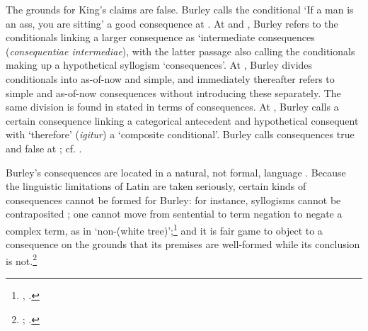\documentclass[]{article}
\begin{document}
{	The grounds for King's claims are false. Burley calls the conditional `If a man is an ass, you are sitting' a good consequence at \cite[II. i. 1, p. 61]{BurleyDPAL}. At \cite[p. 114, par. 8]{Green-Pedersen1980b} and \cite[p. 89.1-31]{BurleyDPAL}, Burley refers to the conditionals linking a larger consequence as `intermediate consequences (\textit{consequentiae intermediae}), with the latter passage also calling the conditionals making up a hypothetical syllogism `consequences'. At \cite[p. 128, par. 68]{Green-Pedersen1980b}, Burley divides conditionals into as-of-now and simple, and immediately thereafter refers to simple and as-of-now consequences without introducing these separately. The same division is found in \cite[pp. 60.28-61.5]{BurleyDPAL} stated in terms of consequences. At \cite[p. 78.27-30]{BurleyDPAL}, Burley calls a certain consequence linking a categorical antecedent and hypothetical consequent with `therefore' (\textit{igitur}) a `composite conditional'. Burley calls consequences true and false at \cite[p. 113, par. 2-3]{Green-Pedersen1980b}; cf. \cite[p. 15, par. 19]{Green-Pedersen1980a}.} 

Burley's consequences are located in a natural, not formal, language \cite[pp. 4-5]{HodgesBurley}. Because the linguistic limitations of Latin are taken seriously, certain kinds of consequences cannot be formed for Burley: for instance, syllogisms cannot be contraposited \cite[pp. 65.3-17; 207.31-208.9]{BurleyDPAL}; one cannot move from sentential to term negation to negate a complex term, as in `non-(white tree)';\footnote{\cite[p. 131, par. 80]{Green-Pedersen1980b}, \cite[pp. 214.14-21, 215.6-21]{BurleyDPAL}.} and it is fair game to object to a consequence on the grounds that its premises are well-formed while its conclusion is not.\footnote{\cite[p. 150, par. 135]{Green-Pedersen1980b}; \cite[pp. 211.31-33, 212.10-20]{BurleyDPAL}.}
\end{document}
